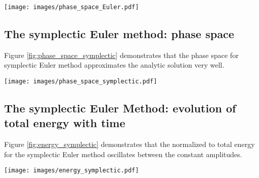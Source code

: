 \documentclass{article}
\newenvironment{Figure}
  {\par\medskip\noindent\minipage{\linewidth}}
  {\endminipage\par\medskip}
\begin{document}
\begin{Figure}
\centering
\texttt{[image: images/phase\_space\_Euler.pdf]}
\label{fig:phase_space_Euler}
\end{Figure}

\newpage
\subsection{The symplectic Euler method: phase space}

Figure \ref{fig:phase_space_symplectic} demonstrates that the phase space for symplectic Euler method approximates the analytic solution very well.

\begin{Figure}
\centering
\texttt{[image: images/phase\_space\_symplectic.pdf]}
\label{fig:phase_space_symplectic}
\end{Figure}

\subsection{The symplectic Euler Method: evolution of total energy with time}

Figure \ref{fig:energy_symplectic} demonstrates that the normalized to total energy for the symplectic Euler method oscillates between the constant amplitudes.

\begin{Figure}
\centering
\texttt{[image: images/energy\_symplectic.pdf]}
\label{fig:energy_symplectic}
\end{Figure}
\end{document}
